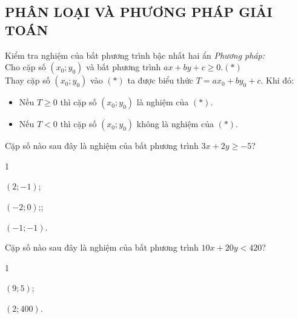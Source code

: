 \subsection{PHÂN LOẠI VÀ PHƯƠNG PHÁP GIẢI TOÁN}
\begin{dang}{Kiểm tra nghiệm của bất phương trình bậc nhất hai ẩn}
	{\it Phương pháp:}\\
	Cho cặp số $\left(x_0;y_0\right)$ và bất phương trình $ax+by+c\geq 0$.\quad $(*)$\\
	Thay cặp số $\left(x_0;y_0\right)$ vào $(*)$ ta được biểu thức $T=ax_0+by_0+c$. Khi đó:
	\begin{itemize}
		\item Nếu $T\geq0$ thì cặp số $\left(x_0;y_0\right)$ là nghiệm của $(*)$.
		\item Nếu $T<0$ thì cặp số $\left(x_0;y_0\right)$ không là nghiệm của $(*)$.
	\end{itemize}
\end{dang}
\begin{vd}%
	Cặp số nào sau đây là nghiệm của bất phương trình $3x+2y\ge -5$?
	\begin{enumEX}{1}
		\item $(2;-1)$\dotfill;		\item $(-2;0)$\dotfill;;
		\item $(-1;-1)$\dotfill.
	\end{enumEX}
\end{vd}
\begin{vd}%
	Cặp số nào sau đây là nghiệm của bất phương trình $10x+20y < 420$?
	\begin{enumEX}{1}
		\item $(9;5)$\dotfill;
		\item $(2;400)$\dotfill.
	\end{enumEX}
\end{vd}
